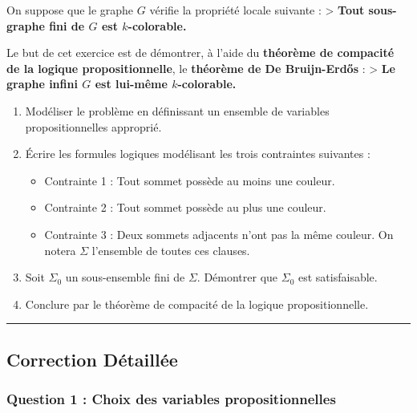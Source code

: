 \documentclass[11pt,a4paper]{article}
\begin{document}
On suppose que le graphe \(G\) vérifie la propriété locale suivante :
\textgreater{} \textbf{Tout sous-graphe fini de \(G\) est
\(k\)-colorable.}

Le but de cet exercice est de démontrer, à l'aide du \textbf{théorème de
compacité de la logique propositionnelle}, le \textbf{théorème de De
Bruijn-Erdős} : \textgreater{} \textbf{Le graphe infini \(G\) est
lui-même \(k\)-colorable.}

\begin{enumerate}
\def\labelenumi{\arabic{enumi}.}
\tightlist
\item
  Modéliser le problème en définissant un ensemble de variables
  propositionnelles approprié.
\item
  Écrire les formules logiques modélisant les trois contraintes
  suivantes :

  \begin{itemize}
  \tightlist
  \item
    Contrainte 1 : Tout sommet possède au moins une couleur.
  \item
    Contrainte 2 : Tout sommet possède au plus une couleur.
  \item
    Contrainte 3 : Deux sommets adjacents n'ont pas la même couleur. On
    notera \(\Sigma\) l'ensemble de toutes ces clauses.
  \end{itemize}
\item
  Soit \(\Sigma_0\) un sous-ensemble fini de \(\Sigma\). Démontrer que
  \(\Sigma_0\) est satisfaisable.
\item
  Conclure par le théorème de compacité de la logique propositionnelle.
\end{enumerate}

\begin{center}\rule{0.5\linewidth}{0.5pt}\end{center}

\hypertarget{correction-duxe9tailluxe9e}{%
\subsection{Correction Détaillée}\label{correction-duxe9tailluxe9e}}

\hypertarget{question-1-choix-des-variables-propositionnelles}{%
\subsubsection{Question 1 : Choix des variables
propositionnelles}\label{question-1-choix-des-variables-propositionnelles}}
\end{document}
